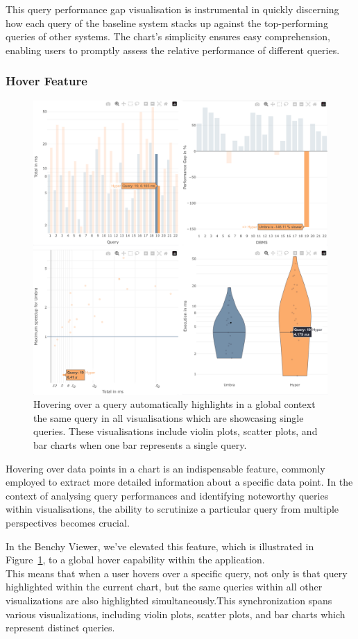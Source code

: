 This query performance gap visualisation is instrumental in quickly discerning how each query of the baseline system stacks up against the top-performing queries of other systems. The chart's simplicity ensures easy comprehension, enabling users to promptly assess the relative performance of different queries.




\subsubsection{Hover Feature}\label{sec:hover-feature}

\begin{figure}[h]
  \centering
  \includegraphics[width=0.6\linewidth]{figures/hover-group.png}
  \caption{Hovering over a query automatically highlights in a global context the same query in all visualisations which are showcasing single queries. These visualisations include violin plots, scatter plots, and bar charts when one bar represents a single query.}
  \label{fig:hover-group}
\end{figure}

Hovering over data points in a chart is an indispensable feature, commonly employed to extract more detailed information about a specific data point. In the context of analysing query performances and identifying noteworthy queries within visualisations, the ability to scrutinize a particular query from multiple perspectives becomes crucial.


 In the Benchy Viewer, we've elevated this feature, which is illustrated in Figure~\ref{fig:hover-group}, to a global hover capability within the application.\\
 This means that when a user hovers over a specific query, not only is that query highlighted within the current chart, but the same queries within all other visualizations are also highlighted simultaneously.This synchronization spans various visualizations, including violin plots, scatter plots, and bar charts which represent distinct queries.




